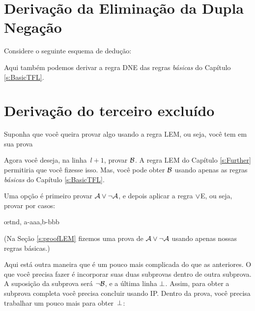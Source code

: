 
\section{Deriva\c c\~ao da Elimina\c c\~ao da Dupla Nega\c c\~ao}
Considere o seguinte esquema de dedu\c c\~ao:
	\begin{fitchproof}
	\open
	\close
\end{fitchproof}
Aqui tamb\'em podemos derivar a regra DNE das regras \emph{b\'asicas} do Capítulo \ref{s:BasicTFL}.

\section{Deriva\c c\~ao do terceiro exclu\'ido}
Suponha que voc\^e queira provar algo usando a regra LEM, ou seja, voc\^e tem em sua prova
 
\begin{fitchproof}
  \open
  \close
  \open
  \close
\end{fitchproof}
Agora voc\^e deseja, na linha~$l+1$, provar $\mathcal{B}$. A regra LEM do Capítulo \ref{s:Further} permitiria que voc\^e fizesse isso. Mas, voc\^e pode obter $\mathcal{B}$ usando apenas as regras  \emph{b\'asicas} do Cap\'itulo \ref{s:BasicTFL}.

Uma op\c c\~ao \'e primeiro provar  $\mathcal{A} \vee \neg\mathcal{A}$, e depois aplicar a regra $\vee$E, ou seja, provar por casos:
\begin{fitchproof}
  \open
  \close
  \open
  \close
  \ellipsesline
  \oe{tnd, a-aaa,b-bbb}
\end{fitchproof}
(Na Seç\~ao \ref{s:proofLEM} fizemos uma prova de $\mathcal{A} \vee \neg\mathcal{A}$  usando apenas nossas regras b\'asicas.)

Aqui est\'a outra maneira que \'e um pouco mais complicada do que as anteriores. O que voc\^e precisa fazer \'e incorporar suas duas subprovas dentro de outra subprova. A suposi\c c\~ao da subprova ser\'a $\neg \mathcal{B}$, e a  \'ultima linha $\bot$. Assim,  para obter a subprova completa voc\^e precisa concluir  usando IP. Dentro da prova, voc\^e precisa trabalhar um pouco mais para obter~$\bot$:

